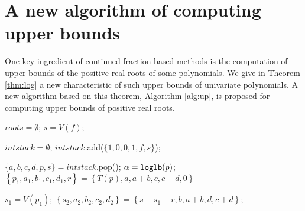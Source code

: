 
\section{A new algorithm of computing upper bounds}

One key ingredient of continued fraction based methods is the computation of upper bounds of the positive real roots of some polynomials. We give in Theorem \ref{thm:log} a new characteristic of such upper bounds of univariate polynomials. A new algorithm based on this theorem, Algorithm \ref{alg:up}, is proposed for computing upper bounds of positive real roots.

\begin{algorithm}
\caption{\algcf \label{alg:cf}}
\DontPrintSemicolon
{}

 $roots=\emptyset$;
  $s=V(f)$;\;

$intstack=\emptyset$;
$intstack$.add($\{1,0,0,1,f,s\}$);\;
 {
  $\{a,b,c,d,p,s\}=intstack.$pop();
  $\alpha={\tt loglb}(p)$;\;
  $ \left\{ p_1,a_1,b_1,c_1,d_1,r \right\}=\left\{ T(p),a,a+b,c,c+d,0 \right\}$

$s_1=V(p_1)$;
$\left\{ s_2,a_2,b_2,c_2,d_2 \right\}=\left\{ s-s_1-r,b,a+b,d,c+d \right\}$;

}
\end{algorithm}

